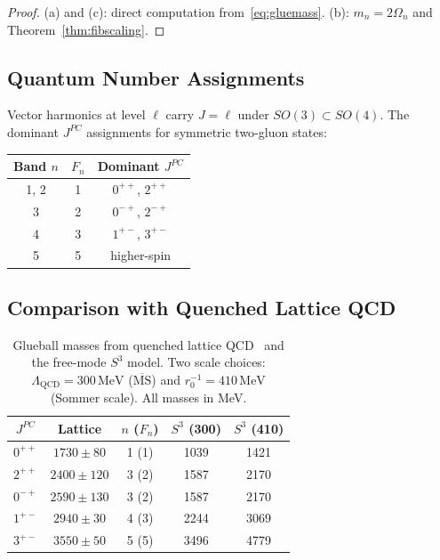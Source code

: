 \documentclass[
  aps,
  prd,
  reprint,
  superscriptaddress,
  nofootinbib,
  longbibliography,
  amsmath,
  amssymb
]{revtex4-2}
\theoremstyle{plain}
\theoremstyle{definition}
\theoremstyle{remark}
\newcommand{\Lqcd}{\Lambda_{\mathrm{QCD}}}
\begin{document}
\begin{proof}
  (a) and (c): direct computation from~\eqref{eq:gluemass}.
  (b): $m_n=2\Omega_n$ and Theorem~\ref{thm:fibscaling}.
\end{proof}

\subsection{Quantum Number Assignments}

Vector harmonics at level $\ell$ carry $J=\ell$ under $SO(3)\subset SO(4)$.
The dominant $J^{PC}$ assignments for symmetric two-gluon states:

\begin{center}
\begin{tabular}{ccc}
\toprule
Band $n$ & $F_n$ & Dominant $J^{PC}$ \\
\midrule
1, 2 & 1 & $0^{++}$, $2^{++}$ \\
3    & 2 & $0^{-+}$, $2^{-+}$ \\
4    & 3 & $1^{+-}$, $3^{+-}$ \\
5    & 5 & higher-spin \\
\bottomrule
\end{tabular}
\end{center}

\subsection{Comparison with Quenched Lattice QCD}

\begin{table}[h]
\centering
\caption{Glueball masses from quenched lattice QCD~\cite{Chen2006}
  and the free-mode $S^3$ model.
  Two scale choices: $\Lqcd=300\,\mathrm{MeV}$
  ($\overline{\mathrm{MS}}$) and $r_0^{-1}=410\,\mathrm{MeV}$
  (Sommer scale). All masses in MeV.}
\label{tab:glueballs}
\begin{tabular}{ccccc}
\toprule
$J^{PC}$ & Lattice & $n$ ($F_n$) &
  $S^3$ (300) & $S^3$ (410) \\
\midrule
$0^{++}$ & $1730\pm80$  & 1 (1) & 1039 & 1421 \\
$2^{++}$ & $2400\pm120$ & 3 (2) & 1587 & 2170 \\
$0^{-+}$ & $2590\pm130$ & 3 (2) & 1587 & 2170 \\
$1^{+-}$ & $2940\pm30$  & 4 (3) & 2244 & 3069 \\
$3^{+-}$ & $3550\pm50$  & 5 (5) & 3496 & 4779 \\
\bottomrule
\end{tabular}
\end{table}
\end{document}

